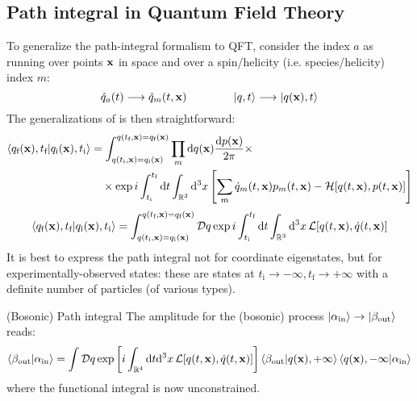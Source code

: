 \subsection{Path integral in Quantum Field Theory}

To generalize the path-integral formalism to QFT, consider the index $ a $ as running over points $ \mathbf{x} $ in space and over a spin/helicity (i.e. species/helicity) index $ m $:
\begin{equation*}
  \hat{q}_a(t) \longrightarrow \hat{q}_m(t,\mathbf{x})
  \qquad \qquad
  \ket{q,t} \longrightarrow \ket{q(\mathbf{x}),t}
\end{equation*}
The generalizations of  is then straightforward:
\begin{equation}
  \begin{split}
    \braket{q_\text{f}(\mathbf{x}),t_\text{f} | q_\text{i}(\mathbf{x}),t_\text{i}}
    & = \int_{q(t_\text{i},\mathbf{x}) = q_\text{i}(\mathbf{x})}^{q(t_\text{f},\mathbf{x}) = q_\text{f}(\mathbf{x})} \prod_m \mathrm{d} q(\mathbf{x}) \frac{\mathrm{d} p(\mathbf{x})}{2\pi} \times \\
    & \quad \times \exp i \int_{t_\text{i}}^{t_\text{f}} \mathrm{d} t \int_{\mathbb{R}^3} \mathrm{d}^3x \left[ \sum_m \dot{q}_m(t,\mathbf{x}) p_m(t,\mathbf{x}) - \mathcal{H}[q(t,\mathbf{x}),p(t,\mathbf{x})] \right]
  \end{split}
  \label{eq:ham-path-int-q}
\end{equation}
\begin{equation}
  \braket{q_\text{f}(\mathbf{x}),t_\text{f} | q_\text{i}(\mathbf{x}),t_\text{i}} = \int_{q(t_\text{i},\mathbf{x}) = q_\text{i}(\mathbf{x})}^{q(t_\text{f},\mathbf{x}) = q_\text{f}(\mathbf{x})} \mathcal{D}q \exp i \int_{t_\text{i}}^{t_\text{f}} \mathrm{d} t \int_{\mathbb{R}^3} \mathrm{d}^3 x\, \mathcal{L}[q(t,\mathbf{x}),\dot{q}(t,\mathbf{x})]
  \label{eq:lag-path-int-q}
\end{equation}
It is best to express the path integral not for coordinate eigenstates, but for experimentally-observed states: these are states at $ t_\text{i} \rightarrow -\infty , t_\text{f} \rightarrow +\infty $ with a definite number of particles (of various types).

\begin{theorem}{(Bosonic) Path integral}{}
  The amplitude for the (bosonic) process $ \ket{\alpha_\text{in}} \rightarrow \ket{\beta_\text{out}} $ reads:
  \begin{equation}
    \braket{\beta_\text{out} | \alpha_\text{in}} = \int \mathcal{D}q \exp \left[ i \int_{\mathbb{R}^4} \mathrm{d} t \mathrm{d}^3 x \, \mathcal{L}[q(t,\mathbf{x}),\dot{q}(t,\mathbf{x})] \right] \braket{\beta_\text{out} | q(\mathbf{x}), +\infty} \braket{q(\mathbf{x}), -\infty | \alpha_\text{in}}
    \label{eq:bos-path-int}
  \end{equation}
  where the functional integral is now unconstrained.
\end{theorem}

